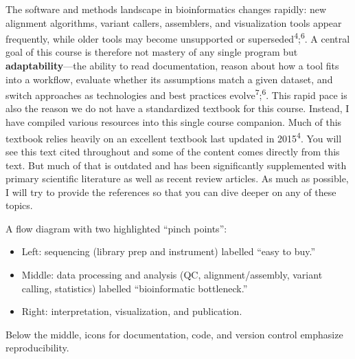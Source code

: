 \documentclass[
  letterpaper,
  DIV=11,
  numbers=noendperiod]{scrreprt}
\providecommand{\tightlist}{%
  \setlength{\itemsep}{0pt}\setlength{\parskip}{0pt}}
\begin{document}
The software and methods landscape in bioinformatics changes rapidly:
new alignment algorithms, variant callers, assemblers, and visualization
tools appear frequently, while older tools may become unsupported or
superseded\textsuperscript{4};\textsuperscript{6}. A central goal of
this course is therefore not mastery of any single program but
\textbf{adaptability}---the ability to read documentation, reason about
how a tool fits into a workflow, evaluate whether its assumptions match
a given dataset, and switch approaches as technologies and best
practices evolve\textsuperscript{7};\textsuperscript{6}. This rapid pace
is also the reason we do not have a standardized textbook for this
course. Instead, I have compiled various resources into this single
course companion. Much of this textbook relies heavily on an excellent
textbook last updated in 2015\textsuperscript{4}. You will see this text
cited throughout and some of the content comes directly from this text.
But much of that is outdated and has been significantly supplemented
with primary scientific literature as well as recent review articles. As
much as possible, I will try to provide the references so that you can
dive deeper on any of these topics.

\begin{tcolorbox}[enhanced jigsaw, toptitle=1mm, arc=.35mm, toprule=.15mm, colframe=quarto-callout-note-color-frame, opacitybacktitle=0.6, breakable, left=2mm, titlerule=0mm, bottomtitle=1mm, rightrule=.15mm, title=\textcolor{quarto-callout-note-color}{\faInfo}\hspace{0.5em}{Figure 1.3 -- From data generation to interpretation}, opacityback=0, colbacktitle=quarto-callout-note-color!10!white, leftrule=.75mm, coltitle=black, bottomrule=.15mm, colback=white]

A flow diagram with two highlighted ``pinch points'':

\begin{itemize}
\tightlist
\item
  Left: sequencing (library prep and instrument) labelled ``easy to
  buy.''\\
\item
  Middle: data processing and analysis (QC, alignment/assembly, variant
  calling, statistics) labelled ``bioinformatic bottleneck.''\\
\item
  Right: interpretation, visualization, and publication.
\end{itemize}

Below the middle, icons for documentation, code, and version control
emphasize reproducibility.

\end{tcolorbox}
\end{document}

